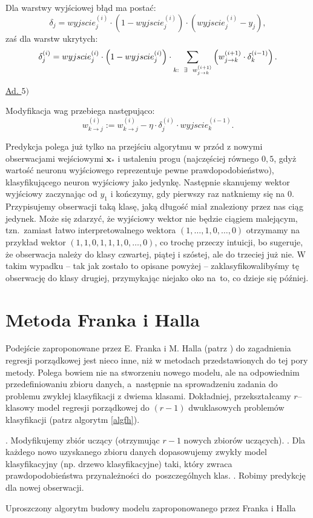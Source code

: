 \documentclass{mini}
\begin{document}
Dla warstwy wyjściowej błąd ma postać:
$$
\delta_j = wyjscie_j^{(i)}\cdot \left( 1- wyjscie_j^{(i)} \right)\cdot(wyjscie_j^{(i)} - y_j),
$$
zaś dla warstw ukrytych:
$$
\delta_j^{(i)} =  wyjscie_j^{(i)}\cdot \left( 1- wyjscie_j^{(i)} \right) \cdot \sum_{k:\hspace{2mm}\exists\hspace{2mm} w^{(i+1)}_{j\rightarrow k}} \left( w^{(i+1)}_{j\rightarrow k}\cdot \delta_k^{(i-1)} \right).
$$

\underline{Ad. $5)$}

Modyfikacja wag przebiega następująco:
$$
w_{k\rightarrow j}^{(i)} := w_{k\rightarrow j}^{(i)} - \eta\cdot\delta_j^{(i)}\cdot wyjscie^{(i-1)}_k.
$$

Predykcja polega już tylko na przejściu algorytmu w przód z nowymi obserwacjami wejściowymi $\textbf{x}_{\ast}$ i ustaleniu progu (najczęściej równego $0,5$, gdyż wartość neuronu wyjściowego reprezentuje pewne prawdopodobieństwo), klasyfikującego neuron wyjściowy jako jedynkę. Następnie skanujemy wektor wyjściowy zaczynając od $y_1$ i kończymy, gdy pierwszy raz natkniemy się na $0$. Przypisujemy obserwacji taką klasę, jaką długość miał znaleziony przez nas ciąg jedynek. Może się zdarzyć, że wyjściowy wektor nie będzie ciągiem malejącym, tzn.~zamiast łatwo interpretowalnego wektora $(1,\ldots,1,0,\ldots,0)$ otrzymamy na przykład wektor $(1,1,0,1,1,1,0,\ldots,0)$, co trochę przeczy intuicji, bo sugeruje, że obserwacja należy do klasy czwartej, piątej i szóstej, ale do trzeciej już nie. W takim wypadku -- tak jak zostało to opisane powyżej -- zaklasyfikowalibyśmy tę obserwację do klasy drugiej, przymykając niejako oko na~to, co dzieje się później.  

\section{Metoda Franka i Halla}

Podejście zaproponowane przez E. Franka i M. Halla (patrz \cite{fh}) do zagadnienia regresji porządkowej jest nieco inne, niż w metodach przedstawionych do tej pory metody. Polega bowiem nie na stworzeniu nowego modelu, ale na odpowiednim przedefiniowaniu zbioru danych, a~następnie na sprowadzeniu zadania do problemu zwykłej klasyfikacji z dwiema klasami. Dokładniej, przekształcamy $r$--klasowy model regresji porządkowej do $(r-1)$ dwuklasowych problemów klasyfikacji (patrz algorytm \ref{algfh}).

\begin{algorithm}
\begin{algorithmic}
\STATE
{}. Modyfikujemy zbiór uczący (otrzymując $r-1$ nowych zbiorów uczących).
\STATE
{}. Dla każdego nowo uzyskanego zbioru danych dopasowujemy zwykły model klasyfikacyjny (np. drzewo klasyfikacyjne) taki, który zwraca prawdopodobieństwa przynależności do~poszczególnych klas.
\STATE
{}. Robimy predykcję dla nowej obserwacji. 
\end{algorithmic}
\caption{Uproszczony algorytm budowy modelu zaproponowanego przez Franka i Halla}
\label{algfh}
\end{algorithm}
\end{document}
